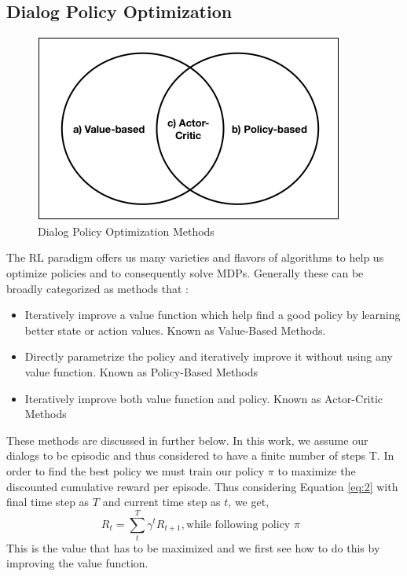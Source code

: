 \documentclass[14pt]{extarticle}
\numberwithin{equation}{section}
\begin{document}
	\subsection{Dialog Policy Optimization}
	\begin{figure}[H]
		\centering
		\includegraphics[scale=0.7]{mdp_methods}
		\caption{Dialog Policy Optimization Methods
			\label{mdp-methods}}
	\end{figure}
	The RL paradigm offers us many varieties and flavors of algorithms\cite{rl_overview} to help us optimize policies and to consequently solve MDPs. Generally these can be broadly categorized as methods that :
	\begin{itemize}
		\item Iteratively improve a value function which help find a good policy by learning better state or action values. Known as Value-Based Methods.
		\item Directly parametrize the policy and iteratively improve it without using any value function. Known as Policy-Based Methods
		\item Iteratively improve both value function and policy. Known as Actor-Critic Methods
	\end{itemize}
	These methods are discussed in further below. In this work, we assume our dialogs to be episodic and thus considered to have a finite number of steps T. In order to find the best policy we must train our policy $\pi$ to maximize the discounted cumulative reward per episode. Thus considering Equation \ref{eq:2} with final time step as $T$ and current time step as $t$, we get,
	\begin{equation}
	R_t =\sum_{t}^{T} { \gamma ^{t} R_{t+1}}, \text{while following policy $\pi$ } \nonumber
	\end{equation}
	This is the value that has to be maximized and we first see how to do this by improving the value function.
\end{document}
